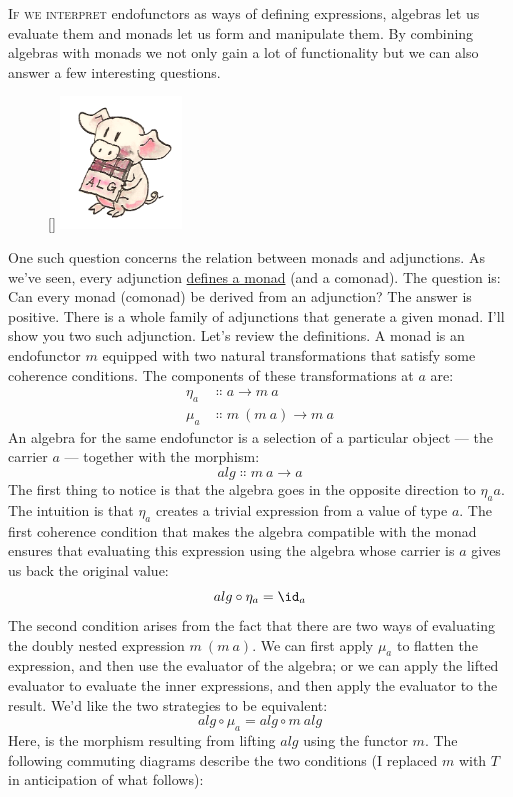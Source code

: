 
\lettrine[lhang=0.17]{I}{f we interpret} endofunctors as ways of defining expressions, algebras
let us evaluate them and monads let us form and manipulate them. By
combining algebras with monads we not only gain a lot of functionality
but we can also answer a few interesting questions.
\begin{figure}
\raisebox{0pt}[\dimexpr{}\baselineskip\relax]{
\includegraphics[width=1.27083in]{images/pigalg.png}}%
\end{figure}

One such question
concerns the relation between monads and adjunctions. As we've seen,
every adjunction \hyperref[monads-categorically]{defines
a monad} (and a comonad). The question is: Can every monad (comonad) be
derived from an adjunction? The answer is positive. There is a whole
family of adjunctions that generate a given monad. I'll show you two
such adjunction.
Let's review the definitions. A monad is an endofunctor $m$
equipped with two natural transformations that satisfy some coherence
conditions. The components of these transformations at $a$ are:
\begin{align*}
\eta_a &\Colon a \to m\ a \\
\mu_a &\Colon m\ (m\ a) \to m\ a
\end{align*}
An algebra for the same endofunctor is a selection of a particular
object --- the carrier $a$ --- together with the morphism:
\[alg \Colon m\ a \to a\]
The first thing to notice is that the algebra goes in the opposite
direction to $\eta_aa$. The intuition is that $\eta_a$ creates a
trivial expression from a value of type $a$. The first coherence
condition that makes the algebra compatible with the monad ensures that
evaluating this expression using the algebra whose carrier is $a$
gives us back the original value:
\[alg \circ \eta_a = \id_a\]
The second condition arises from the fact that there are two ways of
evaluating the doubly nested expression $m\ (m\ a)$. We can first
apply $\mu_a$ to flatten the expression, and then use the evaluator
of the algebra; or we can apply the lifted evaluator to evaluate the
inner expressions, and then apply the evaluator to the result. We'd like
the two strategies to be equivalent:
\[alg \circ \mu_a = alg \circ m\ alg\]
Here,  is the morphism resulting from lifting
$alg$ using the functor $m$. The following commuting
diagrams describe the two conditions (I replaced $m$ with
$T$ in anticipation of what follows):

